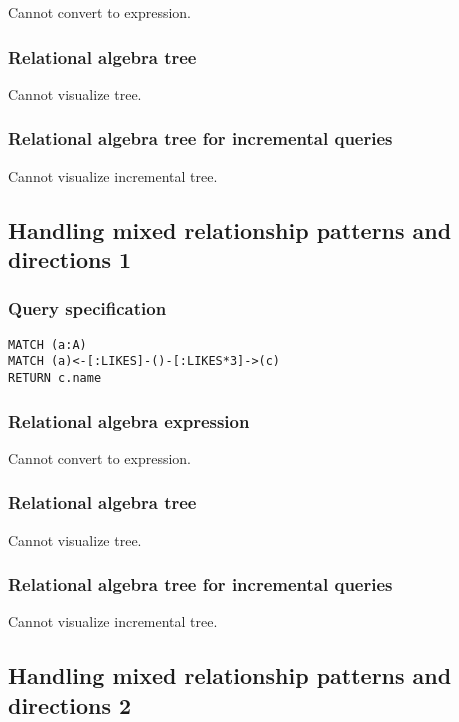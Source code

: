 Cannot convert to expression.

\subsubsection*{Relational algebra tree}

Cannot visualize tree.

\subsubsection*{Relational algebra tree for incremental queries}

Cannot visualize incremental tree.

\subsection{Handling mixed relationship patterns and directions 1}

\subsubsection*{Query specification}

\begin{lstlisting}
MATCH (a:A)
MATCH (a)<-[:LIKES]-()-[:LIKES*3]->(c)
RETURN c.name
\end{lstlisting}

\subsubsection*{Relational algebra expression}

Cannot convert to expression.

\subsubsection*{Relational algebra tree}

Cannot visualize tree.

\subsubsection*{Relational algebra tree for incremental queries}

Cannot visualize incremental tree.

\subsection{Handling mixed relationship patterns and directions 2}

